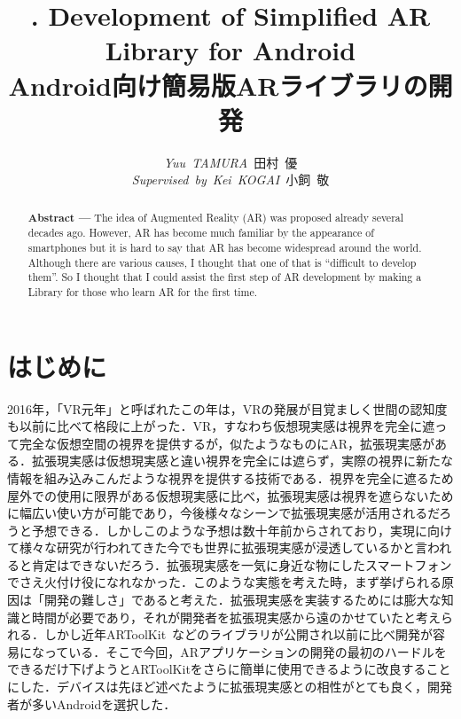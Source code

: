 \documentclass[twocolumn,10pt,a4j]{jsarticle}
\renewcommand\abstractname{}
\begin{document}
\pagestyle{empty}
\renewcommand\abstractname{}

\title{. Development of Simplified AR Library for Android\\Android向け簡易版ARライブラリの開発}

\author{{\it Yuu~TAMURA}~田村~優\\{\it Supervised~by~Kei~KOGAI}~小飼~敬}
\date{}
\begin{abstract}
 \vspace{-20pt}
 \textbf{Abstract ---} 
 The idea of Augmented Reality (AR) was proposed already several decades ago. However, AR has become much familiar by the appearance of smartphones but it is hard to say that AR has become widespread around the world. Although there are various causes, I thought that one of that is ``difficult to develop them''. So I thought that I could assist the first step of AR development by making a Library for those who learn AR for the first time.
\end{abstract}

\maketitle

\section{はじめに}%
 2016年，「VR元年」と呼ばれたこの年は，VRの発展が目覚ましく世間の認知度も以前に比べて格段に上がった．VR，すなわち仮想現実感は視界を完全に遮って完全な仮想空間の視界を提供するが，似たようなものにAR，拡張現実感がある．拡張現実感は仮想現実感と違い視界を完全には遮らず，実際の視界に新たな情報を組み込みこんだような視界を提供する技術である．視界を完全に遮るため屋外での使用に限界がある仮想現実感に比べ，拡張現実感は視界を遮らないために幅広い使い方が可能であり，今後様々なシーンで拡張現実感が活用されるだろうと予想できる．しかしこのような予想は数十年前からされており，実現に向けて様々な研究が行われてきた今でも世界に拡張現実感が浸透しているかと言われると肯定はできないだろう．拡張現実感を一気に身近な物にしたスマートフォンでさえ火付け役になれなかった．このような実態を考えた時，まず挙げられる原因は「開発の難しさ」であると考えた．拡張現実感を実装するためには膨大な知識と時間が必要であり，それが開発者を拡張現実感から遠のかせていたと考えられる．しかし近年ARToolKit~\cite{ARToolKit}などのライブラリが公開され以前に比べ開発が容易になっている．そこで今回，ARアプリケーションの開発の最初のハードルをできるだけ下げようとARToolKitをさらに簡単に使用できるように改良することにした．デバイスは先ほど述べたように拡張現実感との相性がとても良く，開発者が多いAndroidを選択した．
\end{document}
